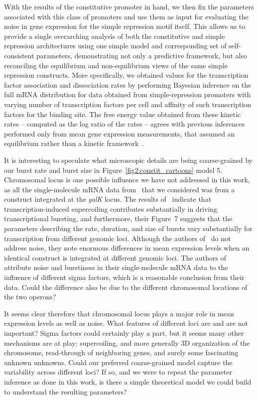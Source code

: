 With the results of the constitutive promoter in hand, we then fix the
parameters associated with this class of promoters and use them as input for
evaluating the noise in gene expression for the simple repression motif itself.
This allows us to provide a single overarching analysis of both the constitutive
and simple repression architectures using one simple model and corresponding set
of self-consistent parameters, demonstrating not only a predictive framework,
but also reconciling the equilibrium and non-equilibrium views of the same
simple repression constructs. More specifically, we obtained values for the
transcription factor association and dissociation rates by performing Bayesian
inference on the full mRNA distribution for data obtained from simple-repression
promoters with varying number of transcription factors per cell and affinity of
such transcription factors for the binding site. The free energy value obtained
from these kinetic rates -- computed as the log ratio of the rates -- agrees
with previous inferences performed only from mean gene expression measurements,
that assumed an equilibrium rather than a kinetic
framework~\cite{Garcia2011a,Razo-Mejia2018}.

It is interesting to speculate what microscopic details are being coarse-grained
by our burst rate and burst size in Figure~\ref{fig2:constit_cartoons} model 5.
Chromosomal locus is one possible influence we have not addressed in this work,
as all the single-molecule mRNA data from~\cite{Jones2014} that we considered
was from a construct integrated at the \textit{galK} locus. The results
of~\cite{Chong2014} indicate that transcription-induced supercoiling contributes
substantially in driving transcriptional bursting, and furthermore, their
Figure~7 suggests that the parameters describing the rate, duration, and size of
bursts vary substantially for transcription from different genomic loci.
Although the authors of~\cite{Englaender2017} do not address noise, they note
enormous differences in mean expression levels when an identical construct is
integrated at different genomic loci. The authors of~\cite{Engl2020} attribute
noise and burstiness in their single-molecule mRNA data to the influence of
different sigma factors, which is a reasonable conclusion from their data. Could
the difference also be due to the different chromosomal locations of the two
operons?

It seems clear therefore that chromosomal locus plays a major role in mean
expression levels as well as noise. What features of different loci are and are
not important? Sigma factors could certainly play a part, but it seems many
other mechanisms are at play: supercoiling, and more generally 3D organization
of the chromosome, read-through of neighboring genes, and surely some
fascinating unknown unknowns. Could our preferred coarse-grained model capture
the variability across different loci? If so, and we were to repeat the
parameter inference as done in this work, is there a simple theoretical model we
could build to understand the resulting parameters?

